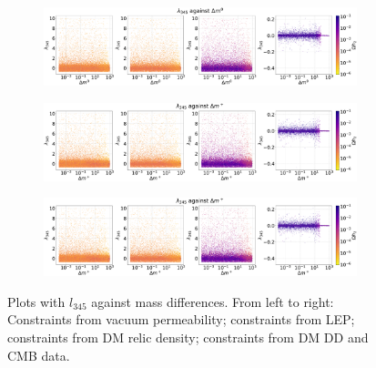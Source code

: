 \documentclass[12pt]{article}
\begin{document}
\begin{figure}[H]
    \begin{subfigure}[b]{\columnwidth}
      \centering
      \includegraphics[width=1\columnwidth]{4plot/l345_DM2.pdf}
    \end{subfigure}
    
    \begin{subfigure}[b]{\columnwidth}
      \centering
      \includegraphics[width=1\columnwidth]{4plot/l345_DMP.pdf}
    \end{subfigure}
    
    \begin{subfigure}[b]{\columnwidth}
      \centering
      \includegraphics[width=1\columnwidth]{4plot/l345_DMP.pdf}
    \end{subfigure}   
\caption{Plots with $l_{345}$ against mass differences. From left to right: Constraints from vacuum permeability; constraints from LEP; constraints from DM relic density; constraints from DM DD and CMB data.}
\end{figure}
\end{document}
